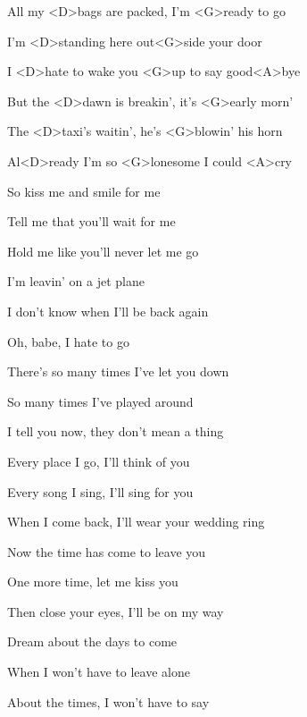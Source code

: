 

\zs
All my <D>bags are packed, I'm <G>ready to go

I'm <D>standing here out<G>side your door

I <D>hate to wake you <G>up to say good<A>bye

But the <D>dawn is breakin', it's <G>early morn'

The <D>taxi's waitin', he's <G>blowin' his horn

Al<D>ready I'm so <G>lonesome I could <A>cry
\ks

\zr
So kiss me and smile for me

Tell me that you'll wait for me

Hold me like you'll never let me go

I'm leavin' on a jet plane

I don't know when I'll be back again

Oh, babe, I hate to go
\kr

\zs
There's so many times I've let you down

So many times I've played around

I tell you now, they don't mean a thing

Every place I go, I'll think of you

Every song I sing, I'll sing for you

When I come back, I'll wear your wedding ring
\ks

\zr\kr

\zs
Now the time has come to leave you

One more time, let me kiss you

Then close your eyes, I'll be on my way

Dream about the days to come

When I won't have to leave alone

About the times, I won't have to say
\ks

\zr\kr

\kp
